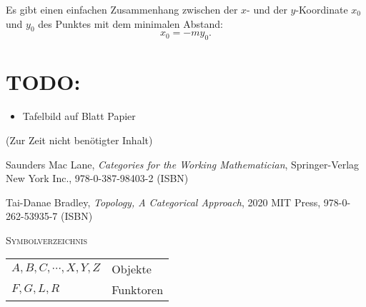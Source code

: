 \documentclass[a4paper]{amsart}
\theoremstyle{definition}
\begin{document}
Es gibt einen einfachen Zusammenhang zwischen der $x$- und der $y$-Koordinate $x_0$ und $y_0$ des Punktes mit dem minimalen Abstand:
\begin{equation}
   x_0 = -my_0.
\end{equation}

\section{TODO:}
\begin{itemize}
   \item Tafelbild auf Blatt Papier
\end{itemize}

\begin{backup}
    (Zur Zeit nicht benötigter Inhalt)
\end{backup}

\begin{thebibliography}{9}

      Saunders Mac Lane, \emph{Categories for the Working Mathematician},
      Springer-Verlag New York Inc., 978-0-387-98403-2 (ISBN)
      
      Tai-Danae Bradley, \emph{Topology, A Categorical Approach},
      2020 MIT Press, 978-0-262-53935-7 (ISBN)

\end{thebibliography}

\begin{large}
    \centerline{\textsc{Symbolverzeichnis}}
\end{large}
\bigskip

\renewcommand*{\arraystretch}{1}

\begin{tabular}{ll}
    $A, B, C, \cdots, X, Y, Z$          & Objekte\\
    $F,G,L,R$ & Funktoren\\

\end{tabular}
\end{document}
